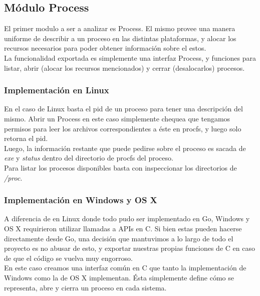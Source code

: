 \subsection{Módulo Process}

El primer modulo a ser a analizar es Process. El mismo provee una manera
uniforme de describir a un proceso en las distintas plataformas, y alocar los
recursos necesarios para poder obtener información sobre el estos.\\

La funcionalidad exportada es simplemente una interfaz Process, y funciones
para listar, abrir (alocar los recursos mencionados) y cerrar (desalocarlos)
procesos.\\

\subsubsection{Implementación en Linux}

En el caso de Linux basta el pid de un proceso para tener una descripción del
mismo. Abrir un Process en este caso simplemente chequea que tengamos permisos
para leer los archivos correspondientes a éste en procfs, y luego solo retorna
el pid.\\

Luego, la información restante que puede pedirse sobre el proceso es sacada de
\textit{exe} y \textit{status} dentro del directorio de procfs del proceso.\\

Para listar los procesos disponibles basta con inspeccionar los directorios de
\textit{/proc}.

\subsubsection{Implementación en Windows y OS X}

A diferencia de en Linux donde todo pudo ser implementado en Go, Windows y OS X
requirieron utilizar llamadas a APIs en C. Si bien estas pueden hacerse
directamente desde Go, una decisión que mantuvimos a lo largo de todo el
proyecto es no abusar de esto, y exportar nuestras propias funciones de C en
caso de que el código se vuelva muy engorroso.\\

En este caso creamos una interfaz común en C que tanto la implementación de
Windows como la de OS X implementan. Ésta simplemente define cómo se representa,
abre y cierra un proceso en cada sistema.\\

